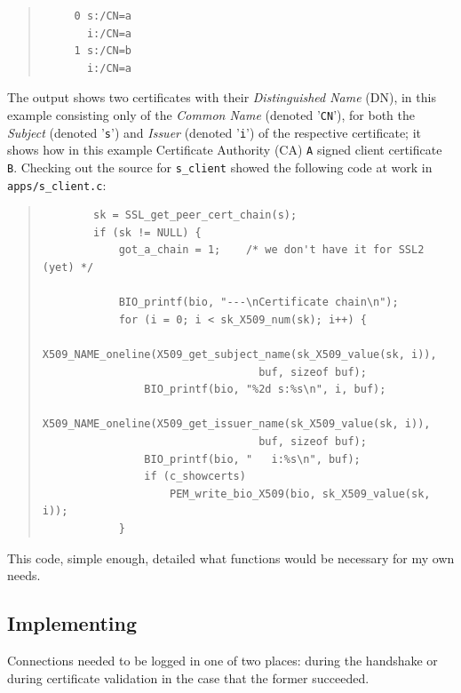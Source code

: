 \documentclass{article}
\begin{document}
\begin{quote}
\begin{verbatim}
	 0 s:/CN=a
	   i:/CN=a
	 1 s:/CN=b
	   i:/CN=a
\end{verbatim}
\end{quote}

The output shows two certificates with their \emph{Distinguished Name} (DN), in this example consisting only of the \emph{Common Name} (denoted '\texttt{CN}'), for both the \emph{Subject} (denoted '\texttt{s}') and \emph{Issuer} (denoted '\texttt{i}') of the respective certificate; it shows how in this example Certificate Authority (CA) \texttt{A} signed client certificate \texttt{B}.  Checking out the source for \texttt{s_client} showed the following code at work in \texttt{apps/s_client.c}:

\begin{quote}
\begin{verbatim}
        sk = SSL_get_peer_cert_chain(s);
        if (sk != NULL) {
            got_a_chain = 1;    /* we don't have it for SSL2 (yet) */

            BIO_printf(bio, "---\nCertificate chain\n");
            for (i = 0; i < sk_X509_num(sk); i++) {
                X509_NAME_oneline(X509_get_subject_name(sk_X509_value(sk, i)),
                                  buf, sizeof buf);
                BIO_printf(bio, "%2d s:%s\n", i, buf);
                X509_NAME_oneline(X509_get_issuer_name(sk_X509_value(sk, i)),
                                  buf, sizeof buf);
                BIO_printf(bio, "   i:%s\n", buf);
                if (c_showcerts)
                    PEM_write_bio_X509(bio, sk_X509_value(sk, i));
            }
\end{verbatim}
\end{quote}

This code, simple enough, detailed what functions would be necessary for my own needs.

\subsection{Implementing}
Connections needed to be logged in one of two places: during the handshake or during certificate validation in the case that the former succeeded.
\end{document}
